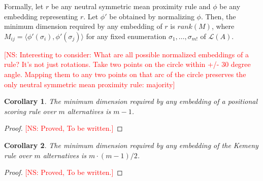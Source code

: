 \documentclass[10pt,letterpaper]{article}
\newcommand{\calL}{{\mathcal{L}}}
\newcommand{\rank}{{\calL(A)}}
\newtheorem{corollary}{Corollary}
\newcommand{\kibitz}[2]{\ifnum\Comments=1\textcolor{#1}{#2}\fi}
\newcommand{\cns}[1]{\kibitz{red} {[NS: #1]}}
\begin{document}
Formally, let $r$ be any neutral symmetric mean proximity rule and $\phi$ be any embedding representing $r$. Let $\phi'$ be obtained by normalizing $\phi$. Then, the minimum dimension required by any embedding of $r$ is $rank(M)$, where $M_{ij} = \langle \phi'(\sigma_i), \phi'(\sigma_j) \rangle$ for any fixed enumeration $\sigma_1,\ldots,\sigma_{m!}$ of $\rank$. 


\cns{Interesting to consider: What are all possible normalized embeddings of a rule? It's not just rotations. Take two points on the circle within +/- 30 degree angle. Mapping them to any two points on that arc of the circle preserves the only neutral symmetric mean proximity rule: majority}

\begin{corollary}
The minimum dimension required by any embedding of a positional scoring rule over $m$ alternatives is $m-1$.
\end{corollary}
\begin{proof}
\cns{Proved, To be written.}
\end{proof}
%

\begin{corollary}
The minimum dimension required by any embedding of the Kemeny rule over $m$ alternatives is $m\cdot(m-1)/2$.
\end{corollary}
\begin{proof}
\cns{Proved, To be written.}
\end{proof}
\end{document}
